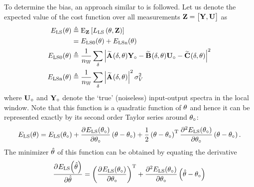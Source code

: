 To determine the bias, an approach similar to \citep[Appendix A]{Guillaume1995} is followed.
Let us denote the expected value of the cost function over all measurements $\LocalVector{Z} = \mat{\LocalMatrix{Y}, \LocalMatrix{U}}$ as
\begin{align}
  \ELSCost{\theta}
              & \isdef 
                   \E[\LocalVector{Z}]%
                         {    
                                \LSCost{\LocalVector{\theta}, \LocalVector{Z}}} \\
              & = \ELSCost[0]{\theta} + \ELSCost[n]{\theta} \\
    \ELSCost[0]{\theta} & \isdef 
            \frac{1}{\nWind} 
                \sum_{\dW} 
                     \left| 
                             \LocalModel{A}(\dW, \LocalVector{\theta}) \true{\LocalVector{Y}}
                          - \LocalModel{B}(\dW, \LocalVector{\theta}) \true{\LocalVector{U}}
                          - \LocalModel{C}(\dW, \LocalVector{\theta}) 
                    \right|^2 \\
    \ELSCost[n]{\theta} & \isdef 
              \frac{1}{\nWind} 
                     \sum_{\dW} 
                              \left| \LocalModel{A}(\dW,\LocalVector{\theta}) \right|^2 
                              \sigma_V^2
\end{align}
where $\true{\LocalVector{U}}$ and $\true{\LocalVector{Y}}$ denote the `true' (noiseless) input-output spectra in the local window.
Note that this function is a quadratic function of $\LocalVector{\theta}$ and hence it can be represented exactly by its second order Taylor series around $\true\theta$:
\begin{multline}
  \ELSCost{\theta} = \ELSCost{\true\theta} 
  + \PartialDerivative{\ELSCost{\true\theta}}{\true\theta}  \left( \theta - \true\theta \right) %
  + \frac{1}{2} \left( \theta - \true\theta \right)^{\T} 
  \PartialDerivative[2]{\ELSCost{\true\theta}}{\true\theta} 
   \left( \theta - \true\theta \right)
   \text{.}
\end{multline}
The minimizer $\estimated\theta$ of this function can be obtained by equating the derivative
\begin{equation}
  \PartialDerivative{\ELSCost{\estimated\theta}}
                                          {\estimated\theta} 
  = 
  \left( \PartialDerivative{\ELSCost{\true\theta}}{\true\theta} \right)^{\T} 
  + \PartialDerivative[2]{\ELSCost{\true\theta}}{\true\theta} \left( \estimated\theta - \true\theta \right)
\end{equation}
